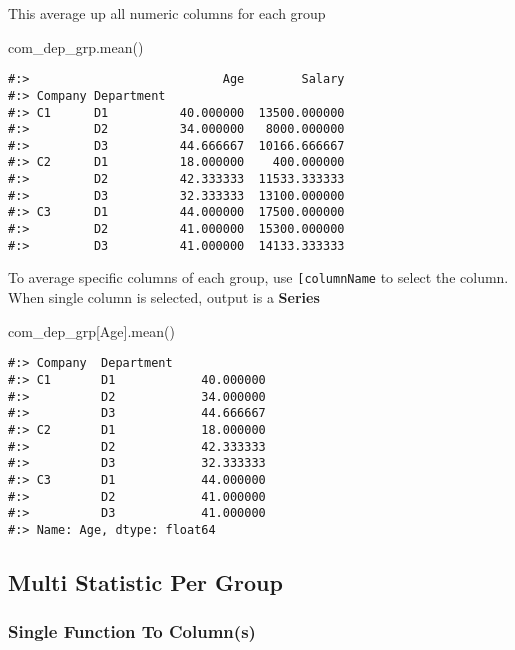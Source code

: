 \documentclass[
]{book}
\newenvironment{Shaded}{\begin{snugshade}}{\end{snugshade}}
\newcommand{\NormalTok}[1]{#1}
\newcommand{\StringTok}[1]{\textcolor[rgb]{0.5,0.5,0.5}{#1}}
\begin{document}
This average up all numeric columns for each group

\begin{Shaded}
\begin{Highlighting}[]
\NormalTok{com\_dep\_grp.mean()}
\end{Highlighting}
\end{Shaded}

\begin{verbatim}
#:>                           Age        Salary
#:> Company Department                         
#:> C1      D1          40.000000  13500.000000
#:>         D2          34.000000   8000.000000
#:>         D3          44.666667  10166.666667
#:> C2      D1          18.000000    400.000000
#:>         D2          42.333333  11533.333333
#:>         D3          32.333333  13100.000000
#:> C3      D1          44.000000  17500.000000
#:>         D2          41.000000  15300.000000
#:>         D3          41.000000  14133.333333
\end{verbatim}

To average specific columns of each group, use \texttt{{[}\textquotesingle{}columnName\textquotesingle{}{]}} to select the column.\\
When single column is selected, output is a \textbf{Series}

\begin{Shaded}
\begin{Highlighting}[]
\NormalTok{com\_dep\_grp[}\StringTok{\textquotesingle{}Age\textquotesingle{}}\NormalTok{].mean()}
\end{Highlighting}
\end{Shaded}

\begin{verbatim}
#:> Company  Department
#:> C1       D1            40.000000
#:>          D2            34.000000
#:>          D3            44.666667
#:> C2       D1            18.000000
#:>          D2            42.333333
#:>          D3            32.333333
#:> C3       D1            44.000000
#:>          D2            41.000000
#:>          D3            41.000000
#:> Name: Age, dtype: float64
\end{verbatim}

\hypertarget{multi-statistic-per-group}{%
\subsection{Multi Statistic Per Group}\label{multi-statistic-per-group}}

\hypertarget{single-function-to-columns}{%
\subsubsection{Single Function To Column(s)}\label{single-function-to-columns}}
\end{document}
